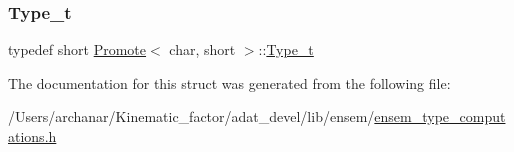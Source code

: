 \subsubsection{\texorpdfstring{Type\_t}{Type\_t}\hspace{0.1cm}{\footnotesize\ttfamily [2/2]}}
{\footnotesize\ttfamily typedef short \mbox{\hyperlink{structPromote}{Promote}}$<$ char, short $>$\+::\mbox{\hyperlink{structPromote_3_01char_00_01short_01_4_a91c7f7533624b9bf6b3e703dee62287a}{Type\+\_\+t}}}



The documentation for this struct was generated from the following file\+:\begin{DoxyCompactItemize}
\item 
/\+Users/archanar/\+Kinematic\+\_\+factor/adat\+\_\+devel/lib/ensem/\mbox{\hyperlink{lib_2ensem_2ensem__type__computations_8h}{ensem\+\_\+type\+\_\+computations.\+h}}\end{DoxyCompactItemize}
